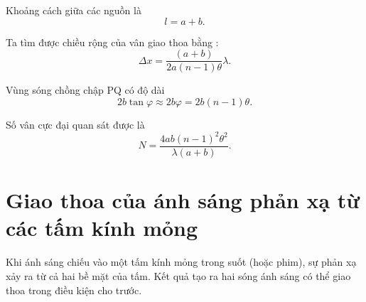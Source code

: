 \noindent
Khoảng cách giữa các nguồn là
\begin{equation*}
    l = a + b.
\end{equation*}

Ta tìm được chiều rộng của vân giao thoa bằng :
\begin{equation}\label{eq:17_30}
    \Delta{x} = \frac{(a + b)}{2 a (n - 1) \theta} \lambda.
\end{equation}

\noindent
Vùng sóng chồng chập PQ có độ dài
\begin{equation*}
    2b \tan\varphi \approx 2b\varphi = 2b (n - 1) \theta.
\end{equation*}

\noindent
Số vân cực đại quan sát được là
\begin{equation}\label{eq:17_31}
    N = \frac{4ab (n-1)^2 \theta^2}{\lambda (a+b)}.
\end{equation}

\section{Giao thoa của ánh sáng phản xạ từ các tấm kính mỏng}\label{sec:17_4}

Khi ánh sáng chiếu vào một tấm kính mỏng trong suốt (hoặc phim), sự phản xạ xảy ra từ cả hai bề mặt của tấm.
Kết quả tạo ra hai sóng ánh sáng có thể giao thoa trong điều kiện cho trước.

